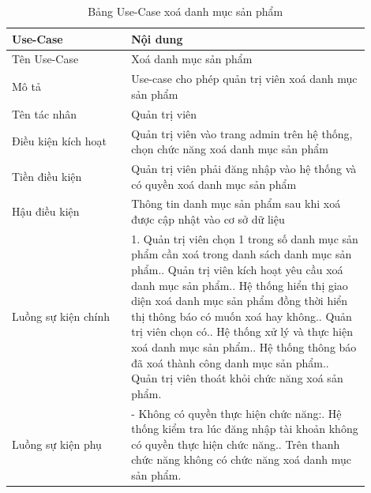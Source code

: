 \begin{longtable}[htp]{ |m{0.3\linewidth}|m{0.6\linewidth}|}
 \caption{Bảng Use-Case xoá danh mục sản phẩm \label{long}}\\
 \hline
 Use-Case & Nội dung \\
 \hline
 Tên Use-Case & Xoá danh mục sản phẩm \\
 \hline
 Mô tả & Use-case cho phép quản trị viên xoá danh mục sản phẩm\\
 \hline
 Tên tác nhân & Quản trị viên\\
 \hline
 Điều kiện kích hoạt & Quản trị viên vào trang admin trên hệ thống, chọn chức năng xoá danh mục sản phẩm\\
 \hline
 Tiền điều kiện & Quản trị viên phải đăng nhập vào hệ thống và có quyền xoá danh mục sản phẩm\\
 \hline
 Hậu điều kiện & Thông tin danh mục sản phẩm sau khi xoá được cập nhật vào cơ sở dữ liệu\\
 \hline
 Luồng sự kiện chính & 
 1. Quản trị viên chọn 1 trong số danh mục sản phẩm cần xoá trong danh sách danh mục sản phẩm.\newline
 2. Quản trị viên kích hoạt yêu cầu xoá danh mục sản phẩm.\newline
 3. Hệ thống hiển thị giao diện xoá danh mục sản phẩm đồng thời hiển thị thông báo có muốn xoá hay không.\newline
 4. Quản trị viên chọn có.\newline
 5. Hệ thống xử lý và thực hiện xoá danh mục sản phẩm.\newline
 6. Hệ thống thông báo đã xoá thành công danh mục sản phẩm.\newline	
 7. Quản trị viên thoát khỏi chức năng xoá sản phẩm.
 \\
 \hline
 Luồng sự kiện phụ & 
  - Không có quyền thực hiện chức năng:\newline
  1. Hệ thống kiểm tra lúc đăng nhập tài khoản không có quyền thực hiện chức năng.\newline
  2. Trên thanh chức năng không có chức năng xoá danh mục sản phẩm.
 \\
 \hline
\end{longtable}

